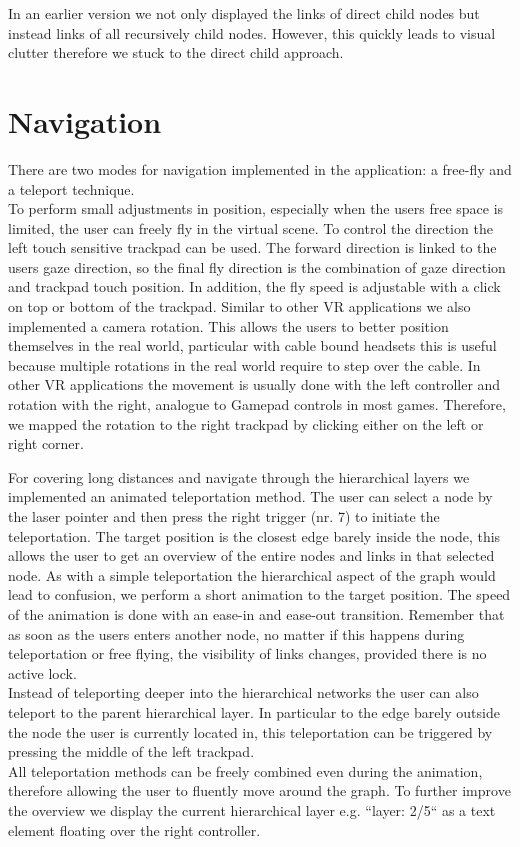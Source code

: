 In an earlier version we not only displayed the links of direct child nodes but instead links of all recursively child nodes. However, this quickly leads to visual clutter therefore we stuck to the direct child approach.

\section{Navigation}
\label{chap:solution-navigation}

There are two modes for navigation implemented in the application: a free-fly and a teleport technique.\\
To perform small adjustments in position, especially when the users free space is limited, the user can freely fly in the virtual scene. To control the direction the left touch sensitive trackpad can be used. 
The forward direction is linked to the users gaze direction, so the final fly direction is the combination of gaze direction and trackpad touch position. 
In addition, the fly speed is adjustable with a click on top or bottom of the trackpad.    
Similar to other VR applications we also implemented a camera rotation. This allows the users to better position themselves in the real world, particular with cable bound headsets this is useful because multiple rotations in the real world require to step over the cable. In other VR applications the movement is usually done with the left controller and rotation with the right, analogue to Gamepad controls in most games. Therefore, we mapped the rotation to the right trackpad by clicking either on the left or right corner.

For covering long distances and navigate through the hierarchical layers we implemented an animated teleportation method. The user can select a node by the laser pointer and then press the right trigger (nr. 7) to initiate the teleportation. The target position is the closest edge barely inside the node, this allows the user to get an overview of the entire nodes and links in that selected node.   
As with a simple teleportation the hierarchical aspect of the graph would lead to confusion, we perform a short animation to the target position. The speed of the animation is done with an ease-in and ease-out transition.
Remember that as soon as the users enters another node, no matter if this happens during teleportation or free flying, the visibility of links changes, provided there is no active lock.\\
Instead of teleporting deeper into the hierarchical networks the user can also teleport to the parent hierarchical layer. In particular to the edge barely outside the node the user is currently located in, this teleportation can be triggered by pressing the middle of the left trackpad.\\
All teleportation methods can be freely combined even during the animation, therefore allowing the user to fluently move around the graph. 
To further improve the overview we display the current hierarchical layer e.g. “layer: 2/5“ as a text element floating over the right controller. 


